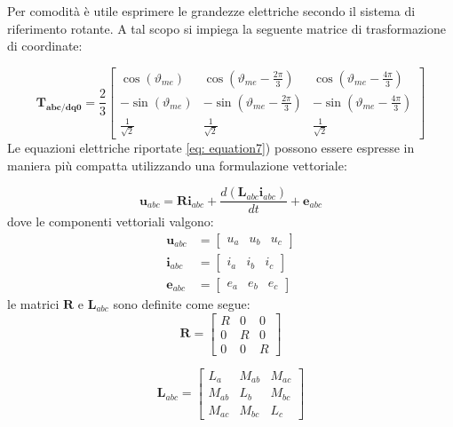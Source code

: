 Per comodità è utile esprimere le grandezze elettriche secondo il sistema di riferimento rotante. A tal scopo si impiega la seguente matrice di trasformazione di coordinate:

\begin{equation}
\mathbf{T_{abc/dq0}} = \frac{2}{3}
\begin{bmatrix}
    \cos (\vartheta_{me}) & \cos \left( \vartheta_{me} - \frac{2\pi}{3} \right) & \cos \left( \vartheta_{me} - \frac{4\pi}{3} \right) \\[6pt]
    -\sin (\vartheta_{me}) & -\sin \left( \vartheta_{me} - \frac{2\pi}{3} \right) & -\sin \left( \vartheta_{me} - \frac{4\pi}{3} \right) \\[6pt]
    \frac{1}{\sqrt{2}} & \frac{1}{\sqrt{2}} & \frac{1}{\sqrt{2}}
\end{bmatrix}
\label{eq:trasformazione_park}
\end{equation}
Le equazioni elettriche riportate \ref{eq: equation7}) possono essere espresse in maniera più compatta utilizzando una formulazione vettoriale:

\begin{equation}
\bm{u}_{abc}=\bm{Ri}_{abc}+\frac{d(\bm{L}_{abc}\bm{i}_{abc})}{dt}+\bm{e}_{abc}
\label{eq:equation10}
\end{equation}
dove le componenti vettoriali valgono:
\begin{align*}
\boldsymbol{u}_{abc} &= \begin{bmatrix} u_a & u_b & u_c \end{bmatrix} \\
\boldsymbol{i}_{abc} &= \begin{bmatrix} i_a & i_b & i_c \end{bmatrix} \\
\boldsymbol{e}_{abc} &= \begin{bmatrix} e_a & e_b & e_c \end{bmatrix}
\end{align*}
 le matrici $\bm{R}$ e $\bm{L}_{abc}$ sono definite come segue:
\begin{equation}
\bm{R} = 
\begin{bmatrix}
    R & 0 & 0 \\[6pt]
    0 & R & 0 \\[6pt]
    0 & 0 & R
\end{bmatrix}
\label{eq:trasformazione_park2}
\end{equation}

\begin{equation}
\bm{L}_{abc} = 
\begin{bmatrix}
    L_a & M_{ab} & M_{ac} \\[6pt]
    M_{ab} & L_b & M_{bc} \\[6pt]
    M_{ac} & M_{bc} & L_c
\end{bmatrix}
\label{eq:trasformazione_park3}
\end{equation}

